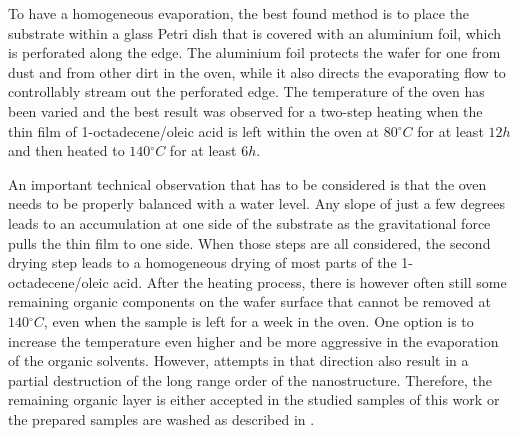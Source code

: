 \documentclass[\main/dresen_thesis.tex]{subfiles}
\begin{document}
    To have a homogeneous evaporation, the best found method is to place the substrate within a glass Petri dish that is covered with an aluminium foil, which is perforated along the edge.
    The aluminium foil protects the wafer for one from dust and from other dirt in the oven, while it also directs the evaporating flow to controllably stream out the perforated edge.
    The temperature of the oven has been varied and the best result was observed for a two-step heating when the thin film of 1-octadecene/oleic acid is left within the oven at $80 \unit{^\circ C}$ for at least $12\unit{h}$ and then heated to $140 \unit{^\circ C}$ for at least $6\unit{h}$.

    An important technical observation that has to be considered is that the oven needs to be properly balanced with a water level.
    Any slope of just a few degrees leads to an accumulation at one side of the substrate as the gravitational force pulls the thin film to one side.
    When those steps are all considered, the second drying step leads to a homogeneous drying of most parts of the 1-octadecene/oleic acid.
    After the heating process, there is however often still some remaining organic components on the wafer surface that cannot be removed at $140 \unit{^\circ C}$, even when the sample is left for a week in the oven.
    One option is to increase the temperature even higher and be more aggressive in the evaporation of the organic solvents.
    However, attempts in that direction also result in a partial destruction of the long range order of the nanostructure.
    Therefore, the remaining organic layer is either accepted in the studied samples of this work or the prepared samples are washed as described in .
\end{document}
